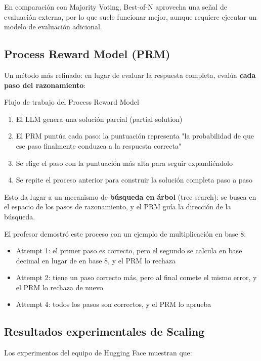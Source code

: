 En comparación con Majority Voting, Best-of-N aprovecha una señal de evaluación externa, por lo que suele funcionar mejor, aunque requiere ejecutar un modelo de evaluación adicional.

\subsection{Process Reward Model (PRM)}

Un método más refinado: en lugar de evaluar la respuesta completa, evalúa \textbf{cada paso del razonamiento}:

\begin{importantbox}{Flujo de trabajo del Process Reward Model}
\begin{enumerate}
    \item El LLM genera una solución parcial (partial solution)
    \item El PRM puntúa cada paso: la puntuación representa "la probabilidad de que ese paso finalmente conduzca a la respuesta correcta"
    \item Se elige el paso con la puntuación más alta para seguir expandiéndolo
    \item Se repite el proceso anterior para construir la solución completa paso a paso
\end{enumerate}
Esto da lugar a un mecanismo de \textbf{búsqueda en árbol} (tree search): se busca en el espacio de los pasos de razonamiento, y el PRM guía la dirección de la búsqueda.
\end{importantbox}

El profesor demostró este proceso con un ejemplo de multiplicación en base 8:

\begin{itemize}
    \item Attempt 1: el primer paso es correcto, pero el segundo se calcula en base decimal en lugar de en base 8, y el PRM lo rechaza
    \item Attempt 2: tiene un paso correcto más, pero al final comete el mismo error, y el PRM lo rechaza de nuevo
    \item Attempt 4: todos los pasos son correctos, y el PRM lo aprueba
\end{itemize}

\subsection{Resultados experimentales de Scaling}

Los experimentos del equipo de Hugging Face muestran que:

